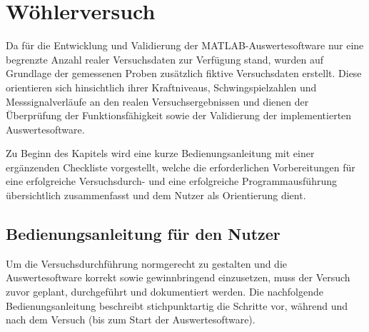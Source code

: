\chapter{Wöhlerversuch}%

Da für die Entwicklung und Validierung der MATLAB-Auswertesoftware nur eine begrenzte Anzahl realer Versuchsdaten zur Verfügung stand, wurden auf Grundlage der gemessenen Proben zusätzlich fiktive Versuchsdaten erstellt. Diese orientieren sich hinsichtlich ihrer Kraftniveaus, Schwingspielzahlen und Messsignalverläufe an den realen Versuchsergebnissen und dienen der Überprüfung der Funktionsfähigkeit sowie der Validierung der implementierten Auswertesoftware.

Zu Beginn des Kapitels wird eine kurze Bedienungsanleitung mit einer ergänzenden Checkliste vorgestellt, welche die erforderlichen Vorbereitungen für eine erfolgreiche Versuchsdurch- und eine erfolgreiche Programmausführung übersichtlich zusammenfasst und dem Nutzer als Orientierung dient.
	
	\section{Bedienungsanleitung für den Nutzer}
Um die Versuchsdurchführung normgerecht zu gestalten und die Auswertesoftware korrekt sowie gewinnbringend einzusetzen, muss der Versuch zuvor geplant, durchgeführt und dokumentiert werden. Die nachfolgende Bedienungsanleitung beschreibt stichpunktartig die Schritte vor, während und nach dem Versuch (bis zum Start der Auswertesoftware).


